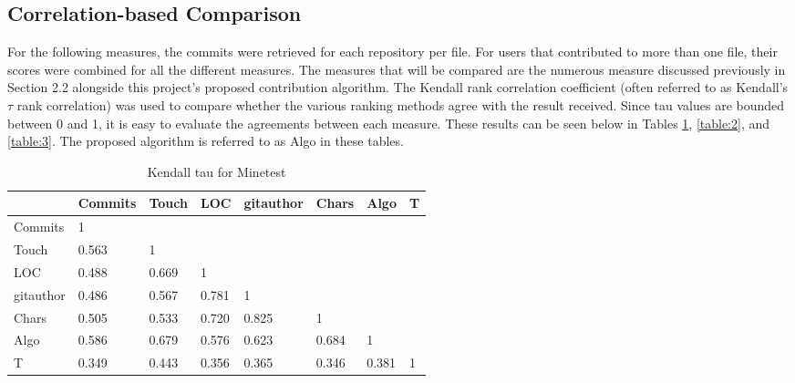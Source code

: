 \subsection{Correlation-based Comparison}

For the following measures, the commits were retrieved for each repository per file. For users that contributed to more than one file, their scores were combined for all the different measures. The measures that will be compared are the numerous measure discussed previously in Section 2.2 alongside this project's proposed contribution algorithm. The Kendall rank correlation coefficient (often referred to as Kendall's $\tau$ rank correlation) was used to compare whether the various ranking methods agree with the result received. Since tau values are bounded between 0 and 1, it is easy to evaluate the agreements between each measure. These results can be seen below in Tables \ref{table:1}, \ref{table:2}, and \ref{table:3}. The proposed algorithm is referred to as Algo in these tables.

\begin{table}[ht]
    \centering
    \begin{tabular}{l l l l l l l l}
         \hline
         & Commits & Touch & LOC & gitauthor & Chars & Algo & T \\
         \hline
         Commits & 1 & & & & & & \\
         Touch & 0.563 & 1 & & & & & \\
         LOC & 0.488 & 0.669 & 1 & & & & \\
         gitauthor & 0.486 & 0.567 & 0.781 & 1 & & & \\
         Chars & 0.505 & 0.533 & 0.720 & 0.825 & 1 & & \\
         Algo & 0.586 & 0.679 & 0.576 & 0.623 & 0.684 & 1 & \\
         T & 0.349 & 0.443 & 0.356 & 0.365 & 0.346 & 0.381 & 1 \\
         \hline
    \end{tabular}
    \caption{Kendall tau for Minetest}
    \label{table:1}
\end{table}

